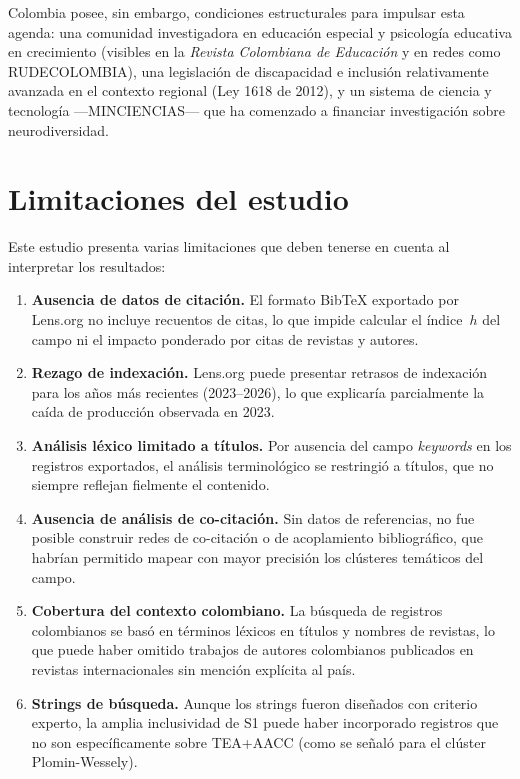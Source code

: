 \documentclass[12pt, a4paper]{article}
\begin{document}
Colombia posee, sin embargo, condiciones estructurales para impulsar esta agenda:
una comunidad investigadora en educación especial y psicología educativa en
crecimiento (visibles en la \textit{Revista Colombiana de Educación} y en redes
como RUDECOLOMBIA), una legislación de discapacidad e inclusión relativamente
avanzada en el contexto regional (Ley 1618 de 2012), y un sistema de ciencia y
tecnología —MINCIENCIAS— que ha comenzado a financiar investigación sobre
neurodiversidad.

\section{Limitaciones del estudio}
\label{sec:limitaciones}

Este estudio presenta varias limitaciones que deben tenerse en cuenta al
interpretar los resultados:

\begin{enumerate}[leftmargin=*, itemsep=3pt]
    \item \textbf{Ausencia de datos de citación.} El formato BibTeX exportado por
    Lens.org no incluye recuentos de citas, lo que impide calcular el índice~$h$
    del campo ni el impacto ponderado por citas de revistas y autores.

    \item \textbf{Rezago de indexación.} Lens.org puede presentar retrasos de
    indexación para los años más recientes (2023--2026), lo que explicaría
    parcialmente la caída de producción observada en 2023.

    \item \textbf{Análisis léxico limitado a títulos.} Por ausencia del campo
    \textit{keywords} en los registros exportados, el análisis terminológico se
    restringió a títulos, que no siempre reflejan fielmente el contenido.

    \item \textbf{Ausencia de análisis de co-citación.} Sin datos de referencias,
    no fue posible construir redes de co-citación o de acoplamiento bibliográfico,
    que habrían permitido mapear con mayor precisión los clústeres temáticos del campo.

    \item \textbf{Cobertura del contexto colombiano.} La búsqueda de registros
    colombianos se basó en términos léxicos en títulos y nombres de revistas, lo
    que puede haber omitido trabajos de autores colombianos publicados en revistas
    internacionales sin mención explícita al país.

    \item \textbf{Strings de búsqueda.} Aunque los strings fueron diseñados con
    criterio experto, la amplia inclusividad de S1 puede haber incorporado registros
    que no son específicamente sobre TEA+AACC (como se señaló para el clúster Plomin-Wessely).
\end{enumerate}
\end{document}
